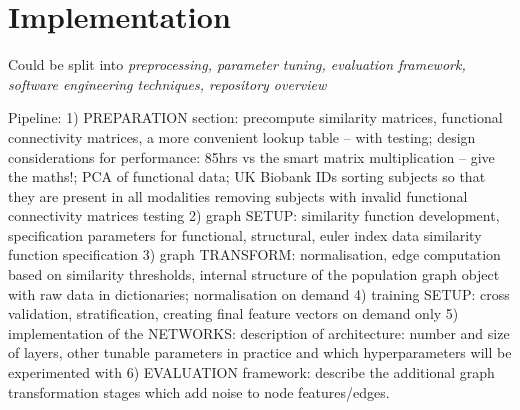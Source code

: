 \chapter{Implementation}


Could be split into \textit{preprocessing, parameter tuning, evaluation framework, software engineering techniques, repository overview}

Pipeline:
1) PREPARATION section:
precompute similarity matrices, functional connectivity matrices, a more convenient lookup table – with testing; design considerations for performance: 85hrs vs the smart matrix multiplication – give the maths!;
PCA of functional data;
UK Biobank IDs 
sorting subjects so that they are present in all modalities
removing subjects with invalid functional connectivity matrices
testing
2) graph SETUP:
similarity function development, 
specification parameters for functional, structural, euler index data
similarity function specification
3) graph TRANSFORM:
normalisation, edge computation based on similarity thresholds, internal structure of the population graph object with raw data in dictionaries; normalisation on demand
4) training SETUP: cross validation, stratification, creating final feature vectors on demand only
5) implementation of the NETWORKS: description of architecture: number and size of layers, other tunable parameters in practice and which hyperparameters will be experimented with
6) EVALUATION framework: describe the additional graph transformation stages which add noise to node features/edges.

